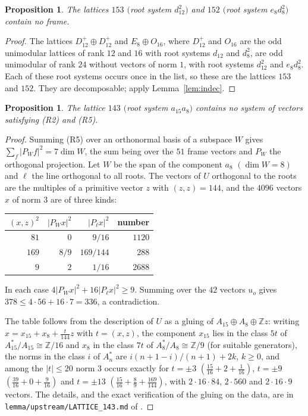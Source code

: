 \documentclass[11pt]{amsart}
\newtheorem{proposition}[theorem]{Proposition}
\theoremstyle{definition}
\theoremstyle{remark}
\newcommand{\Z}{\mathbb{Z}}
\begin{document}
\begin{proposition}\label{prop:153}
The lattices $153$ $($root system $d_{12}^2)$ and $152$ $($root system $e_8d_8^2)$ contain no frame.
\end{proposition}

\begin{proof}
The lattices $D_{12}^+\oplus D_{12}^+$ and $E_8\oplus O_{16}$, where $D_{12}^+$ and $O_{16}$ are the odd unimodular lattices
of rank $12$ and $16$ with root systems $d_{12}$ and $d_8^2$, are odd unimodular of rank $24$ without vectors of norm $1$,
with root systems $d_{12}^2$ and $e_8d_8^2$. Each of these root systems occurs once in the list, so these are the lattices
$153$ and $152$. They are decomposable; apply Lemma~\ref{lem:indec}.
\end{proof}

\begin{proposition}\label{prop:143}
The lattice $143$ $($root system $a_{15}a_8)$ contains no system of vectors satisfying \textup{(R2)} and \textup{(R5)}.
\end{proposition}

\begin{proof}
Summing (R5) over an orthonormal basis of a subspace $W$ gives $\sum_f|P_Wf|^2=7\dim W$, the sum being over the $51$ frame
vectors and $P_W$ the orthogonal projection. Let $W$ be the span of the component $a_8$ $(\dim W=8)$ and $\ell$ the line
orthogonal to all roots. The vectors of $U$ orthogonal to the roots are the multiples of a primitive vector $z$ with
$(z,z)=144$, and the $4096$ vectors $x$ of norm $3$ are of three kinds:
\begin{center}\small
\begin{tabular}{rrrr}
\toprule
$(x,z)^2$ & $|P_Wx|^2$ & $|P_\ell x|^2$ & number\\
\midrule
$81$ & $0$ & $9/16$ & $1120$\\
$169$ & $8/9$ & $169/144$ & $288$\\
$9$ & $2$ & $1/16$ & $2688$\\
\bottomrule
\end{tabular}
\end{center}
In each case $4|P_Wx|^2+16|P_\ell x|^2\ge9$. Summing over the $42$ vectors $u_o$ gives
$378\le4\cdot56+16\cdot7=336$, a contradiction.

The table follows from the description of $U$ as a gluing of $A_{15}\oplus A_8\oplus\Z z$: writing
$x=x_{15}+x_8+\frac{t}{144}z$ with $t=(x,z)$, the component $x_{15}$ lies in the class $5t$ of $A_{15}^*/A_{15}\cong\Z/16$ and
$x_8$ in the class $7t$ of $A_8^*/A_8\cong\Z/9$ (for suitable generators), the norms in the class $i$ of $A_n^*$ are
$i(n+1-i)/(n+1)+2k$, $k\ge0$, and among the $|t|\le20$ norm $3$ occurs exactly for $t=\pm3$ $(\frac{15}{16}+2+\frac1{16})$,
$t=\pm9$ $(\frac{39}{16}+0+\frac{9}{16})$ and $t=\pm13$ $(\frac{15}{16}+\frac89+\frac{169}{144})$, with
$2\cdot16\cdot84$, $2\cdot560$ and $2\cdot16\cdot9$ vectors. The details, and the exact verification of the gluing on the
data, are in \texttt{lemma/upstream/LATTICE\_143.md} of \cite{repo}.
\end{proof}
\end{document}
